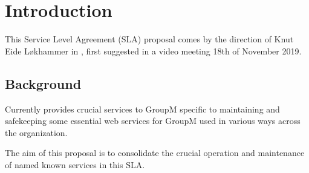 \section{Introduction}
This Service Level Agreement (SLA) proposal comes by the direction of Knut Eide Løkhammer in \customername, first suggested in a video meeting 18th of November 2019.

\subsection{Background}
Currently \suppliername provides crucial services to GroupM specific to maintaining and safekeeping some essential web services for GroupM used in various ways across the organization. 

The aim of this proposal is to consolidate the crucial operation and maintenance of named known services in this SLA. 

